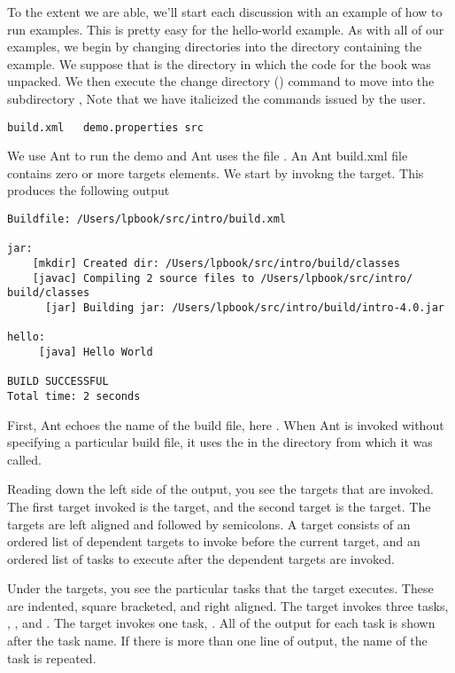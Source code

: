 To the extent we are able, we'll start each discussion with an example
of how to run examples.  This is pretty easy for the hello-world
example.  As with all of our examples, we begin by changing
directories into the directory containing the example.  We suppose
that \relpath{} is the directory in which the code for the book was unpacked.
We then execute the change directory () command to move
into the subdirectory ,
%
%
Note that we have italicized the commands issued by the user.
%
\begin{verbatim}
build.xml	demo.properties	src
\end{verbatim}
%
We use Ant to run the demo and Ant uses the file .
An Ant build.xml file contains zero or more targets elements.
We start by invokng the  target.
%
% 
This produces the following output
%
\begin{verbatim} 
Buildfile: /Users/lpbook/src/intro/build.xml

jar:
    [mkdir] Created dir: /Users/lpbook/src/intro/build/classes
    [javac] Compiling 2 source files to /Users/lpbook/src/intro/
build/classes
      [jar] Building jar: /Users/lpbook/src/intro/build/intro-4.0.jar

hello:
     [java] Hello World

BUILD SUCCESSFUL
Total time: 2 seconds
\end{verbatim}
%
First, Ant echoes the name of the build file, here
.  When Ant is 
invoked without specifying a particular build file, it uses the
 in the directory from which it was called.  

Reading down the left side of the output, you see the targets that are
invoked.  The first target invoked is the  target, and the
second target is the  target.  The targets are left aligned
and followed by semicolons.  A target consists of an ordered list of
dependent targets to invoke before the current target, and an ordered
list of tasks to execute after the dependent targets are invoked.

Under the targets, you see the particular tasks that the target
executes.  These are indented, square bracketed, and right aligned.
The  target invokes three tasks, , ,
and .  The  target invokes one task, .
All of the output for each task is shown after the task name.  If
there is more than one line of output, the name of the task is
repeated.


